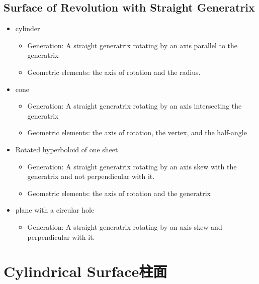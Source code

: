 \documentclass[onecolumn]{ctexart}
\begin{document}
\subsection{Surface of Revolution with Straight Generatrix}
\begin{itemize}
  \item cylinder
  \begin{itemize}
    \item Generation: A straight generatrix rotating by an axis parallel to the generatrix
    \item Geometric elements: the axis of rotation and the radius.
  \end{itemize}
  \item cone
  \begin{itemize}
    \item Generation: A straight generatrix rotating by an axis intersecting the generatrix
    \item Geometric elements: the axis of rotation, the vertex, and the half-angle
  \end{itemize}
  \item Rotated hyperboloid of one sheet
  \begin{itemize}
    \item Generation: A straight generatrix rotating by an axis skew with the generatrix and not perpendicular with it.
    \item Geometric elements: the axis of rotation and the generatrix
  \end{itemize}
  \item plane with a circular hole
  \begin{itemize}
    \item Generation: A straight generatrix rotating by an axis skew and perpendicular with it.
  \end{itemize}
\end{itemize}

\section{Cylindrical Surface柱面}
\end{document}
